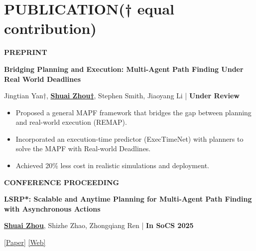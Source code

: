 \documentclass[a4paper,9pt]{extarticle}
\begin{document}
\section*{{\textbf{\fontsize{14pt}{8pt}\selectfont P}\textbf{\scshape UBLICATION}}(† equal contribution)}
{\textbf{\fontsize{12pt}{4pt}\selectfont P}\textbf{\scshape REPRINT}}
\par\vspace{4pt}\noindent
\par\textbf{Bridging Planning and Execution: Multi-Agent Path Finding Under Real World Deadlines}
\par\textup{Jingtian Yan†, \underline{\textbf{Shuai Zhou†}}, Stephen Smith, Jiaoyang Li  \hfill | \textbf{Under Review}}
\begin{itemize} 
    \item Proposed a general MAPF framework that bridges the gap between planning and real-world execution (REMAP). 
    \item Incorporated an execution-time predictor (ExecTimeNet) with planners to solve the MAPF with Real-world Deadlines.
    \item Achieved 20\% less cost in realistic simulations and deployment.
\end{itemize} 
{\textbf{\fontsize{12pt}{4pt}\selectfont C}\textbf{\scshape ONFERENCE PROCEEDING}}
\par\vspace{4pt}\noindent
\par\textbf{LSRP*: Scalable and Anytime Planning for Multi-Agent Path Finding with Asynchronous Actions}
\par\textup{\underline{\textbf{Shuai Zhou}}, Shizhe Zhao, Zhongqiang Ren  \hfill | \textbf{In SoCS 2025}}   %
\par\textup{\textbar{} \href{https://doi.org/10.1609/socs.v18i1.36016}{[Paper]} \textbar{} \href{https://rap-lab.github.io/research/mapfaa}{[Web]} \textbar{}}
\end{document}
